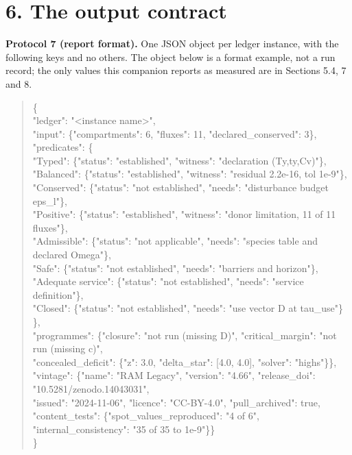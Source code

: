 \documentclass[11pt]{article}
\begin{document}
\vspace{0.8em}

\section*{6. The output contract}\label{6-the-output-contract}

\textbf{Protocol 7 (report format).} One JSON object per ledger instance, with the following keys and no others. The object below is a format example, not a run record; the only values this companion reports as measured are in Sections 5.4, 7 and 8.

\begin{quote}\ttfamily\footnotesize\raggedright\setlength{\parskip}{0pt}
\{\\
  "ledger": "<instance name>",\\
  "input": \{"compartments": 6, "fluxes": 11, "declared\_conserved": 3\},\\
  "predicates": \{\\
     "Typed":            \{"status": "established", "witness": "declaration (Ty,ty,Cv)"\},\\
     "Balanced":         \{"status": "established", "witness": "residual 2.2e-16, tol 1e-9"\},\\
     "Conserved":        \{"status": "not established", "needs": "disturbance budget eps\_l"\},\\
     "Positive":         \{"status": "established", "witness": "donor limitation, 11 of 11 fluxes"\},\\
     "Admissible":       \{"status": "not applicable", "needs": "species table and declared Omega"\},\\
     "Safe":             \{"status": "not established", "needs": "barriers and horizon"\},\\
     "Adequate service": \{"status": "not established", "needs": "service definition"\},\\
     "Closed":           \{"status": "not established", "needs": "use vector D at tau\_use"\}\\
  \},\\
  "programmes": \{"closure": "not run (missing D)", "critical\_margin": "not run (missing c)",\\
                 "concealed\_deficit": \{"z": 3.0, "delta\_star": [4.0, 4.0], "solver": "highs"\}\},\\
  "vintage": \{"name": "RAM Legacy", "version": "4.66", "release\_doi": "10.5281/zenodo.14043031",\\
              "issued": "2024-11-06", "licence": "CC-BY-4.0", "pull\_archived": true,\\
              "content\_tests": \{"spot\_values\_reproduced": "4 of 6", "internal\_consistency": "35 of 35 to 1e-9"\}\}\\
\}
\end{quote}
\end{document}
